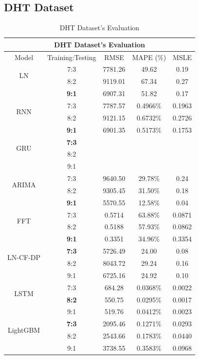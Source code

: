 \documentclass{ieeeojies}
\begin{document}
\subsection{DHT Dataset} 
\begin{table}[H]
    \centering
    \begin{tabular}{|c|c|c|c|c|}
         \hline
         \multicolumn{5}{|c|}{\textbf{DHT Dataset's Evaluation}}\\
         \hline
         \centering Model & Training:Testing & RMSE & MAPE (\%) & MSLE\\
         \hline
         \multirow{2}{*}{LN}& 7:3 & 7781.26 & 49.62 & 0.19\\ & 8:2 & 9119.01 & 67.34 & 0.27\\ & \textbf{9:1}& 6907.31& 51.82 & 0.17\\
         \hline
         \multirow{2}{*}{RNN} & 7:3&7787.57&0.4966\%&0.1963\\ & 8:2&9121.15&0.6732\%& 0.2726\\ & \textbf{9:1} &6901.35 &0.5173\% & 0.1753\\
         \hline
         \multirow{2}{*}{GRU} & \textbf{7:3}	& & & \\ & 8:2 & & & \\ & 9:1 & & & \\
         \hline
         \multirow{2}{*}{ARIMA} & 7:3 & 9640.50 & 29.78\% &0.24 \\ & 8:2 & 9305.45 &31.50\% & 0.18\\ & \textbf{9:1} &5570.55 &12.58\% & 0.04\\
         \hline
         \multirow{2}{*}{FFT}& 7:3	& 0.5714& 63.88\%& 0.0871\\ & 8:2 & 0.5188& 57.93\%& 0.0862\\ & \textbf{9:1} & 0.3351& 34.96\%& 0.3354\\
         \hline
         \multirow{2}{*}{LN-CF-DP} & \textbf{7:3} & 5726.49&24.00&0.08 \\ & {8:2} &8043.72& 29.24& 0.16\\ & 9:1 &6725.16&24.92&0.10\\
         \hline
         \multirow{2}{*}{LSTM}& 7:3& 684.28& 0.0368\%& 0.0022\\ & \textbf{8:2} & 550.75& 0.0295\%& 0.0017\\ & 9:1& 519.76& 0.0412\%& 0.0023\\
         \hline
         \multirow{2}{*}{LightGBM}& \textbf{7:3}& 2095.46& 0.1271\% & 0.0293\\ & 8:2 & 2543.66& 0.1783\% & 0.0440\\ & 9:1& 3738.55& 0.3583\% & 0.0968\\
         \hline
    \end{tabular}
    \caption{DHT Dataset's Evaluation}
    \label{dhtresult}
\end{table}
\end{document}
